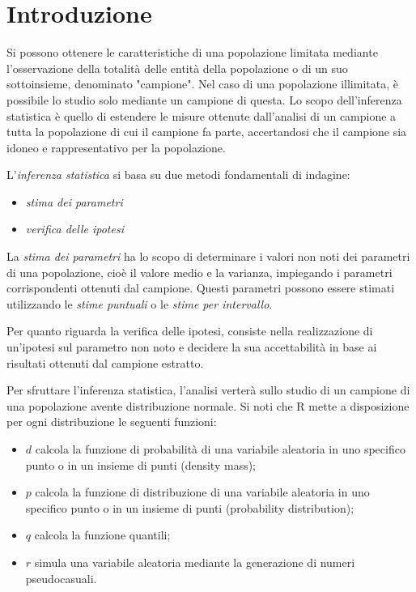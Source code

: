 {}



\chapter{Introduzione}

Si possono ottenere le caratteristiche di una popolazione limitata mediante l'osservazione della totalità delle entità della popolazione o di un suo sottoinsieme, denominato "campione". Nel caso di una popolazione illimitata, è possibile lo studio solo mediante un campione di questa. Lo scopo dell'inferenza statistica è quello di estendere le misure ottenute dall'analisi di un campione a tutta la popolazione di cui il campione fa parte, accertandosi che il campione sia idoneo e rappresentativo per la popolazione.

L'\textit{inferenza statistica} si basa su due metodi fondamentali di indagine:

\begin{itemize}
    \item \textit{stima dei parametri}
    \item \textit{verifica delle ipotesi}
\end{itemize}

La \textit{stima dei parametri} ha lo scopo di determinare i valori non noti dei parametri di una popolazione, cioè il valore medio e la varianza, impiegando i parametri corrispondenti ottenuti dal campione. Questi parametri possono essere stimati utilizzando le \textit{stime puntuali} o le \textit{stime per intervallo}.

Per quanto riguarda la verifica delle ipotesi, consiste nella realizzazione di un'ipotesi sul parametro non noto e decidere la sua accettabilità in base ai risultati ottenuti dal campione estratto.

Per sfruttare l'inferenza statistica, l'analisi verterà sullo studio di un campione di una popolazione avente distribuzione normale. Si noti che R mette a disposizione per ogni distribuzione le seguenti funzioni:

\begin{itemize}
    \item $d$ calcola la funzione di probabilità di una variabile aleatoria in uno specifico punto o in un insieme di punti (density mass);
    \item $p$ calcola la funzione di distribuzione di una variabile aleatoria in uno specifico punto o in un insieme di punti (probability distribution);
    \item $q$ calcola la funzione quantili;
    \item $r$ simula una variabile aleatoria mediante la generazione di numeri pseudocasuali.
\end{itemize}

